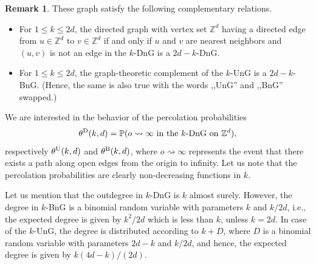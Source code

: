 \documentclass{article}
\theoremstyle{definition}
\newtheorem{remark}[theorem]{Remark}
\newcommand{\1}{\mathbbm{1}}
\newcommand{\0}{\mathbf{o}}
\newcommand{\Z}{\mathbb{Z}}
\begin{document}
\color{blue}
\begin{remark}
These graph satisfy the following complementary relations.
\begin{itemize}
    \item For $1 \le k \leq 2d$, the directed graph with vertex set $\Z^d$ having a directed edge from $u \in \Z^d$ to $v \in \Z^d$ if and only if $u$ and $v$ are nearest neighbors and $(u,v)$ is not an edge in the $k$-DnG is a $2d-k$-DnG.
    \item For $1 \leq k \leq 2d$, the graph-theoretic complement of the $k$-UnG is a $2d-k$-BnG. (Hence, the same is also true with the words ,,UnG'' and ,,BnG'' swapped.)
\end{itemize}
\end{remark}
\color{black}
We are interested in the behavior of the percolation probabilities 
$$
\theta^{\rm D}(k,d)=\mathbb P(o\rightsquigarrow\infty \text{ in the $k$-DnG on $\mathbb Z^d$}),
$$
respectively $\theta^{\rm U}(k,d)$ and $\theta^{\rm B}(k,d)$, %
where $o\rightsquigarrow\infty$ represents the event that there exists a path along open edges from the origin to infinity. Let us note that the percolation probabilities are clearly non-decreasing functions in $k$. 

Let us mention that the outdegree in $k$-DnG is $k$ almost surely. However, the degree in $k$-BnG is a binomial random variable with parameters $k$ and $k/2d$, i.e., the expected degree is given by $k^2/2d$ which is less than $k$, unless $k=2d$. In case of the $k$-UnG, the degree is distributed according to $k+D$, where $D$ is a binomial random variable with parameters $2d-k$ and $k/2d$, and hence, the expected degree is given by $k(4d-k)/(2d)$.
\end{document}
